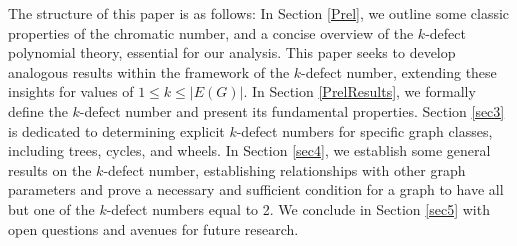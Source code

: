 \documentclass[12pt]{amsart}
\theoremstyle{definition}
\theoremstyle{remark}
\numberwithin{equation}{section}
\begin{document}




 




The structure of this paper is as follows: In Section \ref{Prel}, we outline some classic properties of the chromatic number, and a concise overview of the $k$-defect polynomial theory, essential for our analysis. %
This paper seeks to develop analogous results within the framework of the $k$-defect number, extending these insights for values of \(1\le k\le |E(G)|\). In Section \ref{PrelResults}, we formally define the $k$-defect number and present its fundamental properties. Section \ref{sec3} is dedicated to determining explicit $k$-defect numbers for specific graph classes, including trees, cycles, and wheels. In Section \ref{sec4}, we  establish some general results on the $k$-defect number, establishing relationships with other graph parameters and prove a necessary and sufficient condition for a graph to have all but one of the $k$-defect numbers equal to 2. We conclude in Section \ref{sec5} with open questions and avenues for future research.


\end{document}

